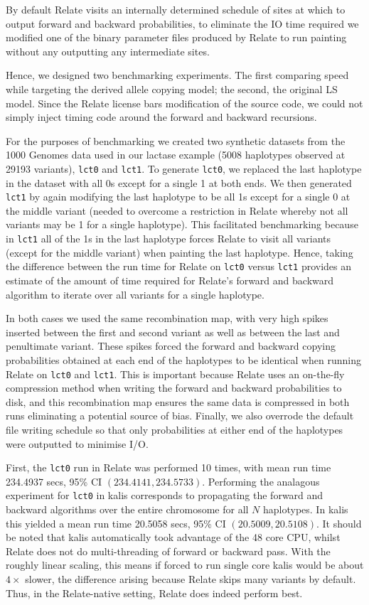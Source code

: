\documentclass[a4paper]{article}
\newcommand{\pkg}[1]{{\fontseries{m}\fontseries{b}\selectfont #1}}
\begin{document}
By default Relate visits an internally determined schedule of sites at which to output forward and backward probabilities, to eliminate the IO time required we modified one of the binary parameter files produced by Relate to run painting without any outputting any intermediate sites.

Hence, we designed two benchmarking experiments.
The first comparing speed while targeting the derived allele copying model; the second, the original LS model.
Since the Relate license bars modification of the source code, we could not simply inject timing code around the forward and backward recursions.

For the purposes of benchmarking we created two synthetic datasets from the 1000 Genomes data used in our lactase example (5008 haplotypes observed at 29193 variants), \texttt{lct0} and \texttt{lct1}.
To generate \texttt{lct0}, we replaced the last haplotype in the dataset with all 0s except for a single 1 at both ends.
We then generated \texttt{lct1} by again modifying the last haplotype to be all 1s except for a single 0 at the middle variant (needed to overcome a restriction in Relate whereby not all variants may be 1 for a single haplotype).
This facilitated benchmarking because in \texttt{lct1} all of the 1s in the last haplotype forces Relate to visit all variants (except for the middle variant) when painting the last haplotype.
Hence, taking the difference between the run time for Relate on \texttt{lct0} versus \texttt{lct1} provides an estimate of the amount of time required for Relate's forward and backward algorithm to iterate over all variants for a single haplotype.

In both cases we used the same recombination map, with very high spikes inserted between the first and second variant as well as between the last and penultimate variant.
These spikes forced the forward and backward copying probabilities obtained at each end of the haplotypes to be identical when running Relate on \texttt{lct0} and \texttt{lct1}.
This is important because Relate uses an on-the-fly compression method when writing the forward and backward probabilities to disk, and this recombination map ensures the same data is compressed in both runs eliminating a potential source of bias.
Finally, we also overrode the default file writing schedule so that only probabilities at either end of the haplotypes were outputted to minimise I/O.

First, the \texttt{lct0} run in Relate was performed 10 times, with mean run time 234.4937 secs, 95\% CI $(234.4141, 234.5733)$.
Performing the analagous experiment for \texttt{lct0} in \pkg{kalis} corresponds to propagating the forward and backward algorithms over the entire chromosome for all $N$ haplotypes.
In \pkg{kalis} this yielded a mean run time 20.5058 secs, 95\% CI $(20.5009, 20.5108)$.
It should be noted that \pkg{kalis} automatically took advantage of the 48 core CPU, whilst Relate does not do multi-threading of forward or backward pass.
With the roughly linear scaling, this means if forced to run single core \pkg{kalis} would be about $4\times$ slower, the difference arising because Relate skips many variants by default.
Thus, in the Relate-native setting, Relate does indeed perform best.
\end{document}
